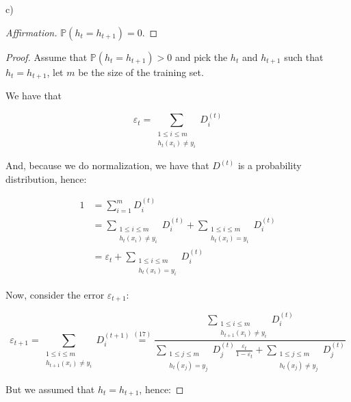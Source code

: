 \documentclass{article}
\newcommand{\<}{\langle}
\renewcommand{\>}{\rangle}
\theoremstyle{definition}
\begin{document}
c) \begin{proof}[Affirmation]\renewcommand{\qedsymbol}{}
$\mathbb{P}(h_t=h_{t+1})=0$.
\end{proof}
\begin{proof}
Assume that $\mathbb{P}(h_t=h_{t+1})>0$ and pick the $h_t$ and $h_{t+1}$ such that $h_t = h_{t+1}$, let $m$ be the size of the training set. 

We have that

\begin{equation}
\varepsilon_t = \sum\limits_{\substack{1\leq i \leq m\\ h_t(x_i)\neq y_i}} D_i^{(t)}    
\end{equation}

And, because we do normalization, we have that $D^{(t)}$ is a probability distribution, hence:

\begin{align}
    1 &= \sum_{i=1}^m D_i^{(t)}
      \\&= \sum\limits_{\substack{1\leq i \leq m\\h_t(x_i)\neq y_i}}D_i^{(t)} + \sum\limits_{\substack{1\leq i \leq m\\h_t(x_i) = y_i}}D_i^{(t)}
      \\&= \varepsilon_t + \sum\limits_{\substack{1\leq i \leq m\\h_t(x_i) = y_i}}D_i^{(t)}
\end{align}

Now, consider the error $\varepsilon_{t+1}$:

\begin{equation}
\varepsilon_{t+1} = \sum\limits_{\substack{1\leq i \leq m\\ h_{t+1}(x_i)\neq y_i}} D_i^{(t+1)} 
\stackrel{(17)}{=}
\frac{ \sum\limits_{\substack{1\leq i \leq m\\ h_{t+1}(x_i)\neq y_i}} 
 D_i^{(t)} }
{\sum\limits_{\substack{1\leq j \leq m\\ h_{t}(x_j) = y_j}}
D_j^{(t)}\frac{\varepsilon_t}{1-\varepsilon_t} +
\sum\limits_{\substack{1\leq j \leq m\\ h_{t}(x_j)\neq y_j}}
D_j^{(t)}
}
\end{equation}

But we assumed that $h_t = h_{t+1}$, hence:


\end{proof}
\end{document}
